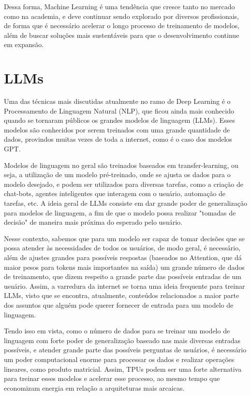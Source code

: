 \documentclass{report}
\begin{document}
Dessa forma, Machine Learning é uma tendência que cresce tanto no mercado como na academia, e deve continuar sendo explorado por diversos profissionais, de forma que é necessário acelerar o longo processo de treinamento de modelos, além de buscar soluções mais sustentáveis para que o desenvolvimento continue em expansão.

\section{LLMs}

Uma das técnicas mais discutidas atualmente no ramo de Deep Learning é o Processamento de Linguagem Natural (NLP), que ficou ainda mais conhecido quando se tornaram públicos os grandes modelos de linguagem (LLMs). Esses modelos são conhecidos por serem treinados com uma grande quantidade de dados, provindos muitas vezes de toda a internet, como é o caso dos modelos GPT.

Modelos de linguagem no geral são treinados baseados em transfer-learning, ou seja, a utilização de um modelo pré-treinado, onde se ajusta os dados para o modelo desejado, e podem ser utilizados para diversas tarefas, como a criação de chat-bots, agentes inteligentes que interagem com o usuário, automação de tarefas, etc. A ideia geral de LLMs consiste em dar grande poder de generalização para modelos de linguagem, a fim de que o modelo possa realizar "tomadas de decisão" de maneira mais próxima do esperado pelo usuário.

Nesse contexto, sabemos que para um modelo ser capaz de tomar decisões que se possa atender às necessidades de todos os usuários, de modo geral, é necessário, além de ajustes grandes para possíveis respostas (baseados no Attention, que dá maior pesos para tokens mais importantes na saída) um grande número de dados de treinamento, que dizem respeito a grande parte das possíveis entradas de um usuário. Assim, a varredura da internet se torna uma ideia frequente para treinar LLMs, visto que se encontra, atualmente, conteúdos relacionados a maior parte dos assuntos que alguém pode querer fornecer de entrada para um modelo de linguagem.

Tendo isso em vista, como o número de dados para se treinar um modelo de linguagem com forte poder de generalização baseado nas mais diversas entradas possíveis, e atender grande parte das possíveis perguntas de usuários, é necessário um poder computacional enorme para processar os dados e realizar operações lineares, como produto matricial. Assim, TPUs podem ser uma forte alternativa para treinar esses modelos e acelerar esse processo, ao mesmo tempo que economizam energia em relação a arquiteturas mais arcaicas.
\end{document}
